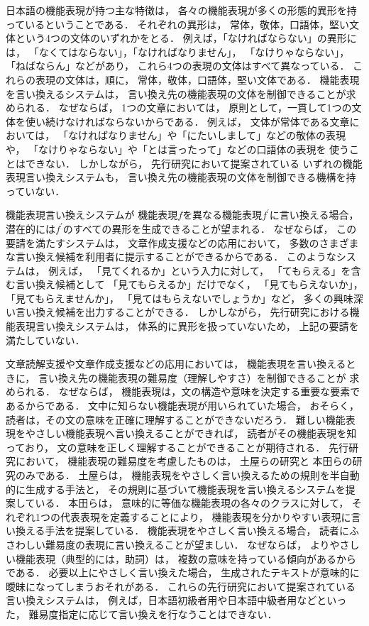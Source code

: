 \documentclass[japanese]{jnlp_1.4}
\begin{document}
日本語の機能表現が持つ主な特徴は，
各々の機能表現が多くの形態的異形を持っているということである．
それぞれの異形は，
常体，敬体，口語体，堅い文体という4つの文体のいずれかをとる．
例えば，「なければならない」の異形には，
「なくてはならない」，「なければなりません」，
「なけりゃならない」，「ねばならん」などがあり，
これら4つの表現の文体はすべて異なっている．
これらの表現の文体は，順に，
常体，敬体，口語体，堅い文体である．
機能表現を言い換えるシステムは，
言い換え先の機能表現の文体を制御できることが求められる．
なぜならば，
1つの文章においては，
原則として，一貫して1つの文体を使い続けなければならないからである．
例えば，
文体が常体である文章においては，
「なければなりません」や「にたいしまして」などの敬体の表現や，
「なけりゃならない」や「とは言ったって」などの口語体の表現を
使うことはできない．
しかしながら，
先行研究において提案されている
いずれの機能表現言い換えシステムも，
言い換え先の機能表現の文体を制御できる機構を持っていない．

機能表現言い換えシステムが
機能表現$f$を異なる機能表現$f^\prime$に言い換える場合，
潜在的には$f^\prime$のすべての異形を生成できることが望まれる．
なぜならば，
この要請を満たすシステムは，
文章作成支援などの応用において，
多数のさまざまな言い換え候補を利用者に提示することができるからである．
このようなシステムは，
例えば，
「見てくれるか」という入力に対して，
「てもらえる」を含む言い換え候補として
「見てもらえるか」だけでなく，
「見てもらえないか」，
「見てもらえませんか」，
「見てはもらえないでしょうか」など，
多くの興味深い言い換え候補を出力することができる．
しかしながら，
先行研究における機能表現言い換えシステムは，
体系的に異形を扱っていないため，
上記の要請を満たしていない．

文章読解支援や文章作成支援などの応用においては，
機能表現を言い換えるときに，
言い換え先の機能表現の難易度（理解しやすさ）を制御できることが
求められる．
なぜならば，
機能表現は，文の構造や意味を決定する重要な要素であるからである．
文中に知らない機能表現が用いられていた場合，
おそらく，
読者は，その文の意味を正確に理解することができないだろう．
難しい機能表現をやさしい機能表現へ言い換えることができれば，
読者がその機能表現を知っており，
文の意味を正しく理解することができることが期待される．
先行研究において，
機能表現の難易度を考慮したものは，
土屋らの研究と
本田らの研究のみである．
土屋らは，
機能表現をやさしく言い換えるための規則を半自動的に生成する手法と，
その規則に基づいて機能表現を言い換えるシステムを提案している．
本田らは，
意味的に等価な機能表現の各々のクラスに対して，
それぞれ1つの代表表現を定義することにより，
機能表現を分かりやすい表現に言い換える手法を提案している．
機能表現をやさしく言い換える場合，
読者にふさわしい難易度の表現に言い換えることが望ましい．
なぜならば，
よりやさしい機能表現（典型的には，助詞）は，
複数の意味を持っている傾向があるからである．
必要以上にやさしく言い換えた場合，
生成されたテキストが意味的に曖昧になってしまうおそれがある．
これらの先行研究において提案されている言い換えシステムは，
例えば，日本語初級者用や日本語中級者用などといった，
難易度指定に応じて言い換えを行なうことはできない．
\end{document}
